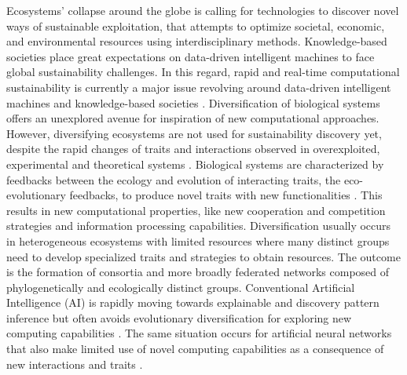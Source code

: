 \documentclass[12pt,a4paper]{article}
\begin{document}

Ecosystems’ collapse around the globe is calling for technologies to discover novel ways of sustainable exploitation, that attempts to optimize societal, economic, and environmental resources using interdisciplinary methods. Knowledge-based societies place great expectations on data-driven intelligent machines to face global sustainability challenges. In this regard, rapid and real-time computational sustainability is currently a major issue revolving around data-driven intelligent machines and knowledge-based societies \cite{Gomesetal2019}. Diversification of biological systems offers an unexplored avenue for inspiration of new computational approaches. However, diversifying ecosystems are not used for sustainability discovery yet, despite the rapid changes of traits and interactions observed in overexploited, experimental and theoretical systems \cite{Hairston2005,Walsh2006,Fussmann2007,Trugman8532}. Biological systems are characterized by feedbacks between the ecology and evolution of interacting traits, the eco-evolutionary feedbacks, to produce novel traits with new functionalities \cite{Govaertetal2019}. This results in new computational properties, like new cooperation and competition strategies and information processing capabilities. Diversification usually occurs in heterogeneous ecosystems with limited resources where many distinct groups need to develop specialized traits and strategies to obtain resources. The outcome is the formation of consortia and more broadly federated networks composed of phylogenetically and ecologically distinct groups. Conventional Artificial Intelligence (AI) is rapidly moving towards explainable and discovery pattern inference \cite{Iten2020a} but often avoids evolutionary diversification for exploring new computing capabilities \cite{Real2020}. The same situation occurs for artificial neural networks that also make limited use of novel computing capabilities as a consequence of new interactions and traits \cite{Schmidhuber:2015}.
\end{document}
